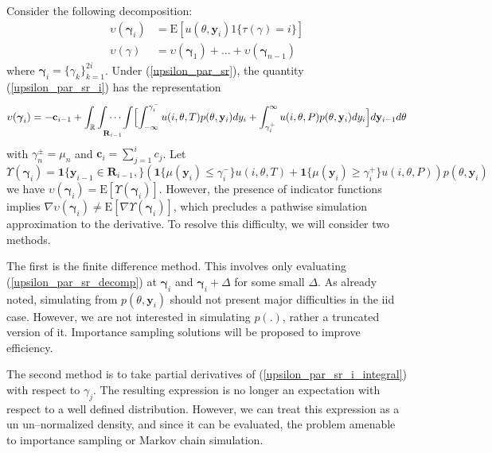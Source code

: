 \documentclass[11pt]{article}
\begin{document}
Consider the following decomposition:
\begin{align}\label{upsilon_par_sr_i}
\upsilon(\boldsymbol{\gamma}_i)&=\mathrm{E}[u(\theta,\mathbf{y}_i)1\{\tau(\gamma)=i\}]\\
\label{upsilon_par_sr_decomp} \upsilon(\gamma)
&=\upsilon(\boldsymbol{\gamma}_1)+...+\upsilon(\boldsymbol{\gamma}_{n-1})
\end{align}where
$\boldsymbol{\gamma}_i=\{\gamma_k\}_{k=1}^{2i}$. Under
(\ref{upsilon_par_sr}), the quantity (\ref{upsilon_par_sr_i}) has
the representation
\begin{equation}\label{upsilon_par_sr_i_integral}
\upsilon(\boldsymbol{\gamma}_i)=-\mathbf{c}_{i-1}+\int_{\mathbb{R}}\idotsint\limits_{\mathbf{R}_{i-1}}\Bigl[\int_{-\infty}^{\gamma_i^{-}}u(i,\theta,T)p(\theta,\mathbf{y}_{i})
d
y_i+\int_{\gamma_i^{+}}^{\infty}u(i,\theta,P)p(\theta,\mathbf{y}_{i})d
y_i\Bigr]d \mathbf{y}_{i-1}  d \theta
\end{equation}with $\gamma_{n}^{\pm}=\mu_{n}$ and $\mathbf{c}_i=\sum_{j=1}^{i}
c_j$. Let
\begin{equation}\Upsilon(\boldsymbol{\gamma}_i)=\boldsymbol{1}\{\mathbf{y}_{i-1}\in
\mathbf{R}_{i-1}, \}(\boldsymbol{1}\{\mu(\mathbf{y}_i)\leq
\gamma_{i}^{-}\}u(i,\theta,T)+\boldsymbol{1}\{\mu(\mathbf{y}_i)\geq
\gamma_{i}^{+}\}u(i,\theta,P))p(\theta,\mathbf{y}_{i})\end{equation}we
have
$\upsilon(\boldsymbol{\gamma}_i)=\mathrm{E}[\Upsilon(\boldsymbol{\gamma}_i)]$.
However, the presence of indicator functions implies $\nabla
\upsilon(\boldsymbol{\gamma}_i)\neq
\mathrm{E}[\nabla\Upsilon(\boldsymbol{\gamma}_i)]$, which precludes
a pathwise simulation approximation to the derivative. To resolve
this difficulty, we will consider two methods.

The first is the finite difference method. This involves only
evaluating (\ref{upsilon_par_sr_decomp}) at $\boldsymbol{\gamma}_i$
and $\boldsymbol{\gamma}_i+\Delta$ for some small $\Delta$. As
already noted, simulating from $p(\theta,\mathbf{y}_i)$ should not
present major difficulties in the iid case. However, we are not
interested in simulating $p(.)$, rather a truncated version of it.
Importance sampling solutions will be proposed to improve
efficiency.

The second method is to take partial derivatives of
(\ref{upsilon_par_sr_i_integral}) with respect to $\gamma_j$. The
resulting expression is no longer an expectation with respect to a
well defined distribution. However, we can treat this expression as
a un un--normalized density, and since it can be evaluated, the
problem amenable to importance sampling or Markov chain simulation.
\end{document}
